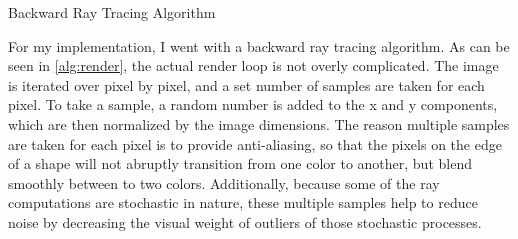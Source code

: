 \documentclass[10pt]{IEEEtran}
\begin{document}
\begin{algorithm}[b]
    \caption{Backward Ray Tracing Algorithm}\label{alg:render}
    \scriptsize
\end{algorithm}

For my implementation, I went with a backward ray tracing algorithm. As can be seen in
\cref{alg:render}, the actual render loop is not overly complicated. The image is iterated over
pixel by pixel, and a set number of samples are taken for each pixel. To take a sample, a random
number is added to the x and y components, which are then normalized by the image dimensions. The
reason multiple samples are taken for each pixel is to provide anti-aliasing, so that the pixels on
the edge of a shape will not abruptly transition from one color to another, but blend smoothly
between to two colors. Additionally, because some of the ray computations are stochastic in nature,
these multiple samples help to reduce noise by decreasing the visual weight of outliers of those
stochastic processes.
\end{document}
